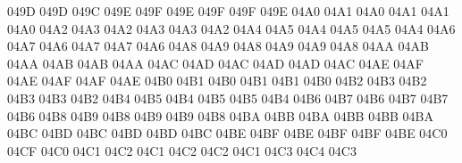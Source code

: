 \setcclcucx 049D 049D 049C %
\setcclcucx 049E 049F 049E %
\setcclcucx 049F 049F 049E %
\setcclcucx 04A0 04A1 04A0 %
\setcclcucx 04A1 04A1 04A0 %
\setcclcucx 04A2 04A3 04A2 %
\setcclcucx 04A3 04A3 04A2 %
\setcclcucx 04A4 04A5 04A4 %
\setcclcucx 04A5 04A5 04A4 %
\setcclcucx 04A6 04A7 04A6 %
\setcclcucx 04A7 04A7 04A6 %
\setcclcucx 04A8 04A9 04A8 %
\setcclcucx 04A9 04A9 04A8 %
\setcclcucx 04AA 04AB 04AA %
\setcclcucx 04AB 04AB 04AA %
\setcclcucx 04AC 04AD 04AC %
\setcclcucx 04AD 04AD 04AC %
\setcclcucx 04AE 04AF 04AE %
\setcclcucx 04AF 04AF 04AE %
\setcclcucx 04B0 04B1 04B0 %
\setcclcucx 04B1 04B1 04B0 %
\setcclcucx 04B2 04B3 04B2 %
\setcclcucx 04B3 04B3 04B2 %
\setcclcucx 04B4 04B5 04B4 %
\setcclcucx 04B5 04B5 04B4 %
\setcclcucx 04B6 04B7 04B6 %
\setcclcucx 04B7 04B7 04B6 %
\setcclcucx 04B8 04B9 04B8 %
\setcclcucx 04B9 04B9 04B8 %
\setcclcucx 04BA 04BB 04BA %
\setcclcucx 04BB 04BB 04BA %
\setcclcucx 04BC 04BD 04BC %
\setcclcucx 04BD 04BD 04BC %
\setcclcucx 04BE 04BF 04BE %
\setcclcucx 04BF 04BF 04BE %
\setcclcucx 04C0 04CF 04C0 %
\setcclcucx 04C1 04C2 04C1 %
\setcclcucx 04C2 04C2 04C1 %
\setcclcucx 04C3 04C4 04C3 %

